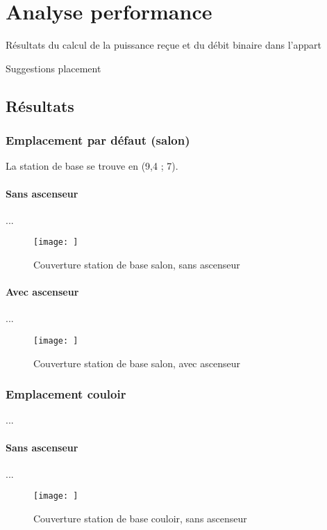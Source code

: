 \chapter{Analyse performance}
\label{chaper-4}

Résultats du calcul de la puissance reçue et du débit binaire dans l'appart

Suggestions placement


\section{Résultats}

\subsection{Emplacement par défaut (salon)}
La station de base se trouve en (9,4 ; 7).

\subsubsection{Sans ascenseur}
...
\begin{figure}[H]
    \centering
    \texttt{[image: ]}
    \caption{Couverture station de base salon, sans ascenseur}
    \label{fig:simu-emplacement-defaut-sansasc}
\end{figure}
\subsubsection{Avec ascenseur}
...
\begin{figure}[H]
    \centering
    \texttt{[image: ]}
    \caption{Couverture station de base salon, avec ascenseur}
    \label{fig:simu-emplacement-defaut-avecasc}
\end{figure}

\subsection{Emplacement couloir}
...
\subsubsection{Sans ascenseur}
...
\begin{figure}[H]
    \centering
    \texttt{[image: ]}
    \caption{Couverture station de base couloir, sans ascenseur}
    \label{fig:simu-emplacement-couloir-sansasc}
\end{figure}
